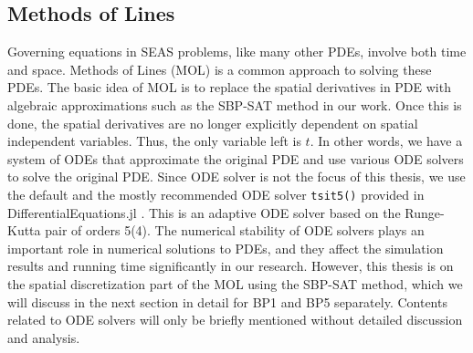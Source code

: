 \subsection{Methods of Lines}
Governing equations in SEAS problems, like many other PDEs, involve both time and space.
Methods of Lines (MOL) is a common approach to solving these PDEs.
The basic idea of MOL is to replace the spatial derivatives in PDE with algebraic approximations such as the SBP-SAT method in our work.
Once this is done, the spatial derivatives are no longer explicitly dependent on spatial independent variables.
Thus, the only variable left is $t$.
In other words, we have a system of ODEs that approximate the original PDE and use various ODE solvers to solve the original PDE.
Since ODE solver is not the focus of this thesis, we use the default and the mostly recommended ODE solver \texttt{tsit5()} provided in DifferentialEquations.jl \citep{TSITOURAS2011770}.
This is an adaptive ODE solver based on the Runge-Kutta pair of orders 5(4).
The numerical stability of ODE solvers plays an important role in numerical solutions to PDEs, and they affect the simulation results and running time significantly in our research. 
However, this thesis is on the spatial discretization part of the MOL using the SBP-SAT method, which we will discuss in the next section in detail for BP1 and BP5 separately.
Contents related to ODE solvers will only be briefly mentioned without detailed discussion and analysis.
